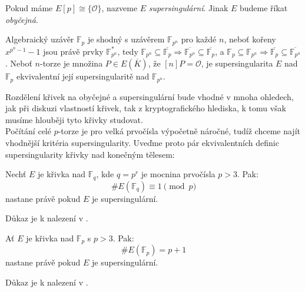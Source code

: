 \documentclass [12pt]{report}
\begin{document}
\begin{definice}
Pokud máme $E[p] \cong \lbrace \mathcal{O} \rbrace $, nazveme $E$ \textit{supersingulární}. Jinak $E$ budeme říkat \textit{obyčejná}.
\end{definice}

\begin{poznamka}
Algebraický uzávěr $\mathbb{F}_p$ je shodný s uzávěrem $\mathbb{F}_{p^n}$ pro každé $n$, neboť kořeny $x^{p^n-1}-1$ jsou právě prvky $\mathbb{F}_{p^n}^*$, tedy $\mathbb{F}_{p^n} \subseteq \overline{\mathbb{F}_p} \Rightarrow \overline{\mathbb{F}_{p^n}} \subseteq \overline{\mathbb{F}_p}$, a $\mathbb{F}_p \subseteq \mathbb{F}_{p^n} \Rightarrow \overline{\mathbb{F}_p } \subseteq \overline{\mathbb{F}_{p^n}}$. Neboť $n$-torze je množina $P \in E(\overline{K})$, že $[n]P = \mathcal{O}$, je supersingularita $E$ nad $\mathbb{F}_p$ ekvivalentní její supersingularitě nad $\mathbb{F}_{p^n}$.
\end{poznamka}

Rozdělení křivek na obyčejné a supersingulární bude vhodné v mnoha ohledech, jak při diskuzi vlastností křivek, tak z kryptografického hlediska, k tomu však musíme hlouběji tyto křivky studovat.\\

Počítání celé $p$-torze je pro velká prvočísla výpočetně náročné, tudíž chceme najít vhodnější kritéria supersingularity. Uveďme proto pár ekvivalentních definic supersingularity křivky nad konečným tělesem:

\begin{veta}\label{super}
Nechť $E$ je křivka nad $\mathbb{F}_q$, kde $q = p^r$ je mocnina prvočísla $p > 3$. Pak: $$\# E(\mathbb{F}_q) \equiv 1 \pmod{p}$$  nastane právě pokud $E$ je supersingulární.
\end{veta}

Důkaz je k nalezení v \cite[Prop.~4.31]{Washington}. 

\begin{veta}\label{super2}
Ať $E$ je křivka nad $\mathbb{F}_p$ s $p > 3$. Pak: $$\# E(\mathbb{F}_p) = p+1$$  nastane právě pokud $E$ je supersingulární.
\end{veta}

Důkaz je k nalezení v \cite[Cor.~4.32]{Washington}. 
\end{document}
